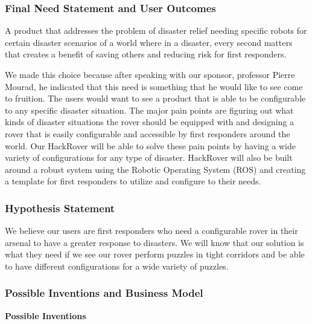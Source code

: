 \documentclass[a4paper, 10pt]{article}
\begin{document}
		\subsubsection{Final Need Statement and User Outcomes}
		A product that addresses the problem of disaster relief needing specific robots for certain disaster scenarios of a world where in a disaster, every second matters that creates a benefit of saving others and reducing risk for first responders.

We made this choice because after speaking with our sponsor, professor Pierre Mourad, he indicated that this need is something that he would like to see come to fruition. The users would want to see a product that is able to be configurable to any specific disaster situation. The major pain points are figuring out what kinds of disaster situations the rover should be equipped with and designing a rover that is easily configurable and accessible by first responders around the world. Our HackRover will be able to solve these pain points by having a wide variety of configurations for any type of disaster. HackRover will also be built around a robust system using the Robotic Operating System (ROS) and creating a template for first responders to utilize and configure to their needs.

		\subsubsection{Hypothesis Statement}
		We believe our users are first responders who need a configurable rover in their arsenal to have a greater response to disasters. We will know that our solution is what they need if we see our rover perform puzzles in tight corridors and be able to have different configurations for a wide variety of puzzles.


		\subsubsection{Possible Inventions and Business Model}
		\textbf{Possible Inventions}
\end{document}
